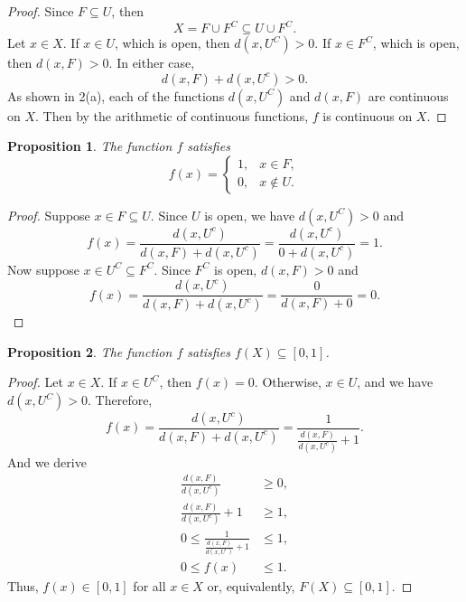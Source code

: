 \documentclass[12pt]{article}
\newtheorem{proposition}{Proposition}
\begin{document}
\begin{proof}
    Since $F \subseteq U$, then
    \[
        X = F \cup F^C \subseteq U \cup F^C.
    \]
    Let $x \in X$. If $x \in U$, which is open, then $d(x, U^C) > 0$. If $x \in F^C$, which is open, then $d(x, F) > 0$. In either case,
    \[
        d(x,F) + d(x,U^c) > 0.
    \]
    As shown in 2(a), each of the functions $d(x, U^C)$ and $d(x, F)$ are continuous on $X$. Then by the arithmetic of continuous functions, $f$ is continuous on $X$.
    
\end{proof}

\begin{proposition}
    The function $f$ satisfies
    \begin{equation*}
        f(x) = \left \{ \begin{array}{lr}
            1,& x\in F,\\
            0,& x\notin U. 
        \end{array}\right .
    \end{equation*}
\end{proposition}

\begin{proof}
    Suppose $x \in F \subseteq U$. Since $U$ is open, we have $d(x, U^C) > 0$ and
    \[
        f(x) = \frac{d(x,U^c)}{d(x,F) + d(x,U^c)} = \frac{d(x,U^c)}{0 + d(x,U^c)} = 1.
    \]
    Now suppose $x \in U^C \subseteq F^C$. Since $F^C$ is open, $d(x, F) > 0$ and
    \[
        f(x) = \frac{d(x,U^c)}{d(x,F) + d(x,U^c)} = \frac{0}{d(x,F) + 0} = 0.
    \]
    
\end{proof}

\begin{proposition}
    The function $f$ satisfies $f(X) \subseteq [0,1]$.
\end{proposition}

\begin{proof}
    Let $x \in X$. If $x \in U^C$, then $f(x) = 0$. Otherwise, $x \in U$, and we have $d(x, U^C) > 0$. Therefore,
    \[
        f(x) = \frac{d(x,U^c)}{d(x,F) + d(x,U^c)} = \frac{1}{\frac{d(x,F)}{d(x,U^c)} + 1}.
    \]
    And we derive
    \begin{align*}
        \frac{d(x,F)}{d(x,U^c)} &\geq 0, \\
         \frac{d(x,F)}{d(x,U^c)} + 1 &\geq 1, \\
         0 \leq \frac{1}{\frac{d(x,F)}{d(x,U^c)} + 1} &\leq 1, \\
         0 \leq f(x) &\leq 1.
    \end{align*}
    Thus, $f(x) \in [0, 1]$ for all $x \in X$ or, equivalently, $F(X) \subseteq [0, 1]$.
    
\end{proof}
\end{document}
